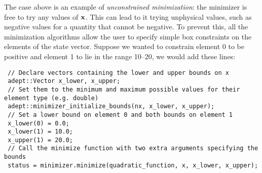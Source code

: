 \documentclass[a4,oneside]{book}
\begin{document}
The case above is an example of \emph{unconstrained minimization}: the
minimizer is free to try any values of ${\bf x}$. This can lead to it
trying unphysical values, such as negative values for a quantity that
cannot be negative.  To prevent this, all the minimization algorithms
allow the user to specify simple box constraints on the elements of
the state vector.  Suppose we wanted to constrain element 0 to be
positive and element 1 to lie in the range 10--20, we would add these
lines:
\begin{lstlisting}
 // Declare vectors containing the lower and upper bounds on x
 adept::Vector x_lower, x_upper;
 // Set them to the minimum and maximum possible values for their element type (e.g. double)
 adept::minimizer_initialize_bounds(nx, x_lower, x_upper);
 // Set a lower bound on element 0 and both bounds on element 1
 x_lower(0) = 0.0;
 x_lower(1) = 10.0;
 x_upper(1) = 20.0;
 // Call the minimize function with two extra arguments specifying the bounds
 status = minimizer.minimize(quadratic_function, x, x_lower, x_upper);
\end{lstlisting}

\end{document}
